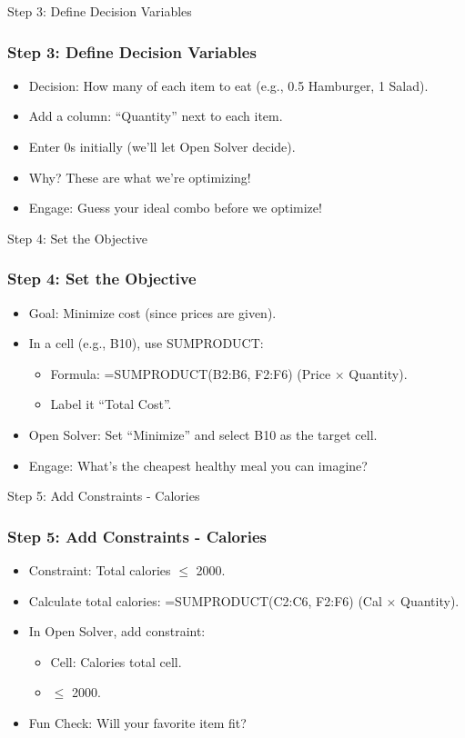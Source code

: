 \documentclass{beamer}
\begin{document}
\begin{frame}{Step 3: Define Decision Variables}
\frametitle{Step 3: Define Decision Variables}
\begin{itemize}
  \item Decision: How many of each item to eat (e.g., 0.5 Hamburger, 1 Salad).
  \item Add a column: ``Quantity'' next to each item.
  \item Enter 0s initially (we’ll let Open Solver decide).
  \item Why? These are what we’re optimizing!
  \item Engage: Guess your ideal combo before we optimize!
\end{itemize}
\end{frame}

\begin{frame}{Step 4: Set the Objective}
\frametitle{Step 4: Set the Objective}
\begin{itemize}
  \item Goal: Minimize cost (since prices are given).
  \item In a cell (e.g., B10), use SUMPRODUCT:
    \begin{itemize}
      \item Formula: =SUMPRODUCT(B2:B6, F2:F6) (Price × Quantity).
    \item Label it ``Total Cost''.
    \end{itemize}
  \item Open Solver: Set ``Minimize'' and select B10 as the target cell.
  \item Engage: What’s the cheapest healthy meal you can imagine?
\end{itemize}
\end{frame}

\begin{frame}{Step 5: Add Constraints - Calories}
\frametitle{Step 5: Add Constraints - Calories}
\begin{itemize}
  \item Constraint: Total calories \(\leq\) 2000.
  \item Calculate total calories: =SUMPRODUCT(C2:C6, F2:F6) (Cal × Quantity).
  \item In Open Solver, add constraint:
    \begin{itemize}
      \item Cell: Calories total cell.
      \item \(\leq\) 2000.
    \end{itemize}
  \item Fun Check: Will your favorite item fit?
\end{itemize}
\end{frame}
\end{document}
